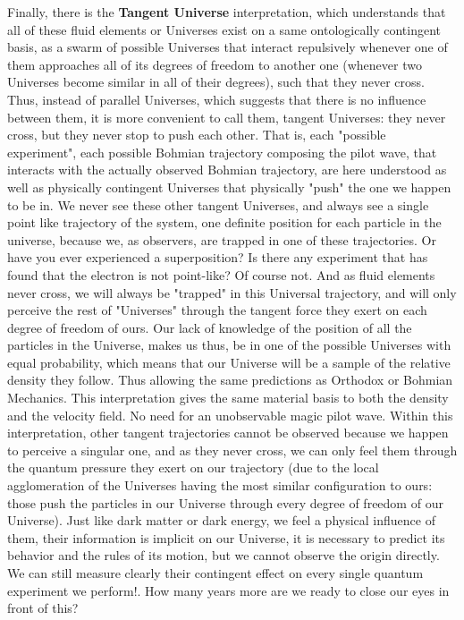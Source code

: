 \documentclass[11pt, a4paper]{article} %
\begin{document}
Finally, there is the {\bf Tangent Universe} interpretation, which understands that all of these fluid elements or Universes exist on a same ontologically contingent basis, as a swarm of possible Universes that interact repulsively whenever one of them approaches all of its degrees of freedom to another one (whenever two Universes become similar in all of their degrees), such that they never cross. Thus, instead of parallel Universes, which suggests that there is no influence between them, it is more convenient to call them, tangent Universes: they never cross, but they never stop to push each other. That is, each "possible experiment", each possible Bohmian trajectory composing the pilot wave, that interacts with the actually observed Bohmian trajectory, are here understood as well as physically contingent Universes that physically "push" the one we happen to be in. We never see these other tangent Universes, and always see a single point like trajectory of the system, one definite position for each particle in the universe, because we, as observers, are trapped in one of these trajectories. Or have you ever experienced a superposition? Is there any experiment that has found that the electron is not point-like? Of course not. And as fluid elements never cross, we will always be "trapped" in this Universal trajectory, and will only perceive the rest of "Universes" through the tangent force they exert on each degree of freedom of ours. Our lack of knowledge of the position of all the particles in the Universe, makes us thus, be in one of the possible Universes with equal probability, which means that our Universe will be a sample of the relative density they follow. Thus allowing the same predictions as Orthodox or Bohmian Mechanics. This interpretation gives the same material basis to both the density and the velocity field. No need for an unobservable magic pilot wave. Within this interpretation, other tangent trajectories cannot be observed because we happen to perceive a singular one, and as they never cross, we can only feel them through the quantum pressure they exert on our trajectory (due to the local agglomeration of the Universes having the most similar configuration to ours: those push the particles in our Universe through every degree of freedom of our Universe). Just like dark matter or dark energy, we feel a physical influence of them, their information is implicit on our Universe, it is necessary to predict its behavior and the rules of its motion, but we cannot observe the origin directly. We can still measure clearly their contingent effect on every single quantum experiment we perform!. How many years more are we ready to close our eyes in front of this?
\end{document}
